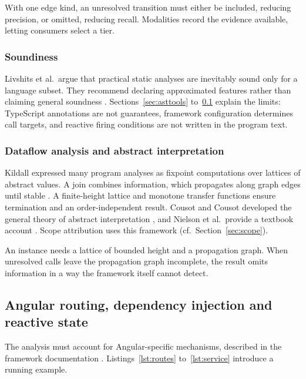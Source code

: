With one edge kind, an unresolved transition must either be included, reducing precision,
or omitted, reducing recall. Modalities record the evidence available, letting consumers
select a tier.

\subsubsection{Soundiness}
\label{sec:soundiness}

Livshits et al.\ argue that practical static analyses are inevitably sound only for a
language subset. They recommend declaring approximated features rather than claiming general
soundness \cite{livshits2015soundiness}.
Sections~\ref{sec:asttools} to~\ref{sec:angular} explain the limits: TypeScript annotations
are not guarantees, framework configuration determines call targets, and reactive firing
conditions are not written in the program text.

\subsubsection{Dataflow analysis and abstract interpretation}

Kildall expressed many program analyses as fixpoint computations over lattices of abstract
values. A join combines information, which propagates along graph edges until stable
\cite{kildall1973unified}. A finite-height lattice and monotone transfer functions ensure
termination and an order-independent result. Cousot and Cousot developed the general theory
of abstract interpretation \cite{cousot1977abstract}, and Nielson et al.\ provide a textbook
account \cite{nielson1999principles}. Scope attribution uses
this framework (cf.~Section~\ref{sec:scope}).

An instance needs a lattice of bounded height and a propagation graph. When unresolved calls leave
the propagation graph incomplete, the result omits information in a way the framework itself cannot
detect.

\subsection{Angular routing, dependency injection and reactive state}
\label{sec:angular}

The analysis must account for Angular-specific mechanisms,
described in the framework documentation \cite{angulardocs}. Listings~\ref{lst:routes}
to~\ref{lst:service} introduce a running example.

